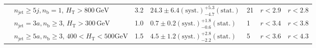\begin{table}[h!]
\begin{tabular}{ lllllll }
 & $n_{\mathrm{jet}} \geq5j,n_{\mathrm{b}} =1$, $H_{\mathrm{T}} > 800 \, \mathrm{GeV}$ & 3.2 & $24.3 \pm 6.4 \mathrm{(syst.)} ^{+5.3}_{-4.7} \mathrm{(stat.)}$ & 21 & $r < 2.9$ & $r < 2.8$\\ 
 & $n_{\mathrm{jet}} =3a,n_{\mathrm{b}} \geq3$, $H_{\mathrm{T}} > 300 \, \mathrm{GeV}$ & 1.0 & $0.7 \pm 0.2 \mathrm{(syst.)} ^{+1.8}_{-0.6} \mathrm{(stat.)}$ & 1 & $r < 3.4$ & $r < 3.8$\\ 
 & $n_{\mathrm{jet}} \geq5a,n_{\mathrm{b}} \geq3$, $400 < H_{\mathrm{T}} < 500 \mathrm{GeV}$ & 1.5 & $4.5 \pm 1.2 \mathrm{(syst.)} ^{+2.8}_{-2.2} \mathrm{(stat.)}$ & 5 & $r < 3.6$ & $r < 4.3$\\ \hline
    \hline
  \end{tabular}
\end{table}


\clearpage
